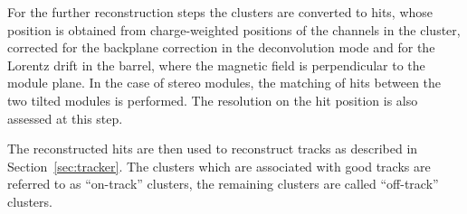 For the further reconstruction steps the clusters are converted to hits, whose position is obtained from charge-weighted positions of the channels in the cluster, corrected for the backplane correction in the deconvolution mode and for the Lorentz drift in the barrel, where the magnetic field is perpendicular to the module plane. In the case of stereo modules, the matching of hits between the two tilted modules is performed. The resolution on the hit position is also assessed at this step.




The reconstructed hits are then used to reconstruct tracks as described in Section~\ref{sec:tracker}. The clusters which are associated with good tracks are referred to as ``on-track'' clusters, the remaining clusters are called ``off-track'' clusters.


